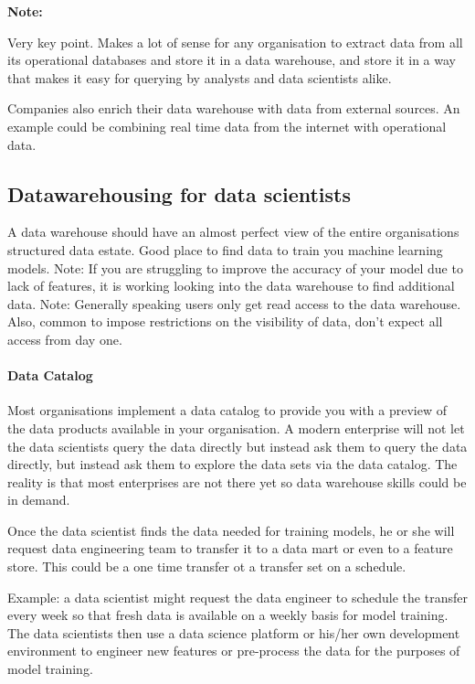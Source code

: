 \documentclass[a4paper, 11pt]{article}
\newenvironment{note}{
    \begin{siderule}
        \textbf{Note: }
        }{
    \end{siderule}}
\begin{document}
    \begin{note}
        Very key point.
        Makes a lot of sense for any organisation to extract data from all its operational databases and store it in a data warehouse,
        and store it in a way that makes it easy for querying by analysts and data scientists alike.
    \end{note}

    Companies also enrich their data warehouse with data from external sources.
    An example could be combining real time data from the internet with operational data.

    \subsection{Datawarehousing for data scientists}

    A data warehouse should have an almost perfect view of the entire organisations structured data estate.
    Good place to find data to train you machine learning models.
    Note: If you are struggling to improve the accuracy of your model due to lack of features, it is working looking into the data warehouse to find additional data.
    Note: Generally speaking users only get read access to the data warehouse.
    Also, common to impose restrictions on the visibility of data, don't expect all access from day one.

    \paragraph{Data Catalog}
    Most organisations implement a data catalog to provide you with a preview of the data products available in your organisation.
    A modern enterprise will not let the data scientists query the data directly but instead ask them to query the data directly, but instead ask them to explore the data sets via the data catalog.
    The reality is that most enterprises are not there yet so data warehouse skills could be in demand.

    Once the data scientist finds the data needed for training models, he or she will request data engineering team to transfer it to a data mart or even to a feature store.
    This could be a one time transfer ot a transfer set on a schedule.

    Example: a data scientist might request the data engineer to schedule the transfer every week so that fresh data is available on a weekly basis for model training.
    The data scientists then use a data science platform or his/her own development environment to engineer new features or pre-process the data for the purposes of model training.
\end{document}
